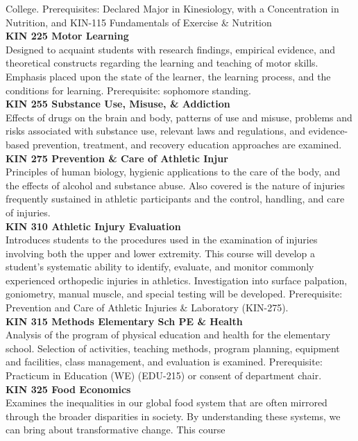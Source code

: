 \documentclass[
  letterpaper,
]{scrbook}
\begin{document}
College. Prerequisites: Declared Major in Kinesiology, with a
Concentration in Nutrition, and KIN-115 Fundamentals of Exercise \&
Nutrition\\
\textbf{KIN 225 Motor Learning}\\
Designed to acquaint students with research findings, empirical
evidence, and theoretical constructs regarding the learning and teaching
of motor skills. Emphasis placed upon the state of the learner, the
learning process, and the conditions for learning. Prerequisite:
sophomore standing.\\
\textbf{KIN 255 Substance Use, Misuse, \& Addiction}\\
Effects of drugs on the brain and body, patterns of use and misuse,
problems and risks associated with substance use, relevant laws and
regulations, and evidence-based prevention, treatment, and recovery
education approaches are examined.\\
\textbf{KIN 275 Prevention \& Care of Athletic Injur}\\
Principles of human biology, hygienic applications to the care of the
body, and the effects of alcohol and substance abuse. Also covered is
the nature of injuries frequently sustained in athletic participants and
the control, handling, and care of injuries.\\
\textbf{KIN 310 Athletic Injury Evaluation}\\
Introduces students to the procedures used in the examination of
injuries involving both the upper and lower extremity. This course will
develop a student's systematic ability to identify, evaluate, and
monitor commonly experienced orthopedic injuries in athletics.
Investigation into surface palpation, goniometry, manual muscle, and
special testing will be developed. Prerequisite: Prevention and Care of
Athletic Injuries \& Laboratory (KIN-275).\\
\textbf{KIN 315 Methods Elementary Sch PE \& Health}\\
Analysis of the program of physical education and health for the
elementary school. Selection of activities, teaching methods, program
planning, equipment and facilities, class management, and evaluation is
examined. Prerequisite: Practicum in Education (WE) (EDU-215) or consent
of department chair.\\
\textbf{KIN 325 Food Economics}\\
Examines the inequalities in our global food system that are often
mirrored through the broader disparities in society. By understanding
these systems, we can bring about transformative change. This course
\end{document}
